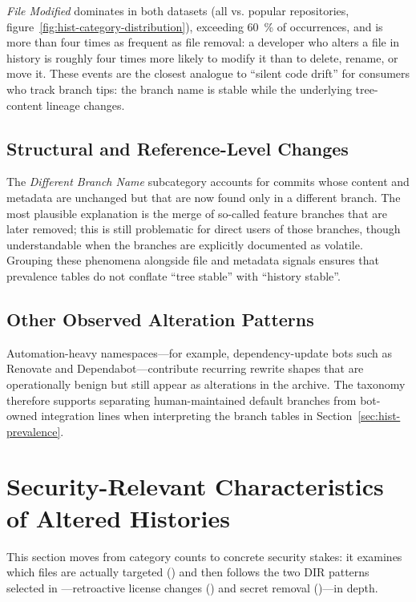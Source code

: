 \emph{File Modified} dominates in both datasets (all vs. popular repositories, figure~\ref{fig:hist-category-distribution}), exceeding \SI{60}{\percent} of occurrences, and is more than four times as frequent as file removal: a developer who alters a file in history is roughly four times more likely to modify it than to delete, rename, or move it.
These events are the closest analogue to ``silent code drift'' for consumers who track branch tips: the branch name is stable while the underlying tree-content lineage changes.

\subsection{Structural and Reference-Level Changes}
\label{subsec:hist-tax-structural}

The \emph{Different Branch Name} subcategory accounts for \DBNRootCauseCommitsShort commits whose content and metadata are unchanged but that are now found only in a different branch.
The most plausible explanation is the merge of so-called feature branches that are later removed; this is still problematic for direct users of those branches, though understandable when the branches are explicitly documented as volatile.
Grouping these phenomena alongside file and metadata signals ensures that prevalence tables do not conflate ``tree stable'' with ``history stable''.

\subsection{Other Observed Alteration Patterns}
\label{subsec:hist-tax-other}

Automation-heavy namespaces---for example, dependency-update bots such as Renovate and Dependabot---contribute recurring rewrite shapes that are operationally benign but still appear as alterations in the archive.
The taxonomy therefore supports separating human-maintained default branches from bot-owned integration lines when interpreting the branch tables in Section~\ref{sec:hist-prevalence}.

\section{Security-Relevant Characteristics of Altered Histories}
\label{sec:hist-security}

This section moves from category counts to concrete security stakes: it examines which files are actually targeted () and then follows the two DIR patterns selected in ---retroactive license changes () and secret removal ()---in depth.

